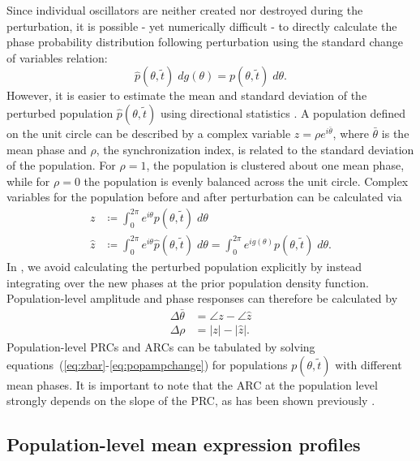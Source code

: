 Since individual oscillators are neither created nor destroyed during the perturbation, it is possible - yet numerically difficult - to directly calculate the phase probability distribution following perturbation using the standard change of variables relation:
\begin{equation}
  \hat{p}(\theta, \tilde{t})\; dg(\theta) = p(\theta, \tilde{t})\; d\theta.
  \label{eq:pdfinversion}
\end{equation}
However, it is easier to estimate the mean and standard deviation of the perturbed population $\hat{p}(\theta, \tilde{t})$ using directional statistics \cite{Mardia2009}.
A population defined on the unit circle can be described by a complex variable $z = \rho e^{i\bar{\theta}}$, where $\bar{\theta}$ is the mean phase and $\rho$, the synchronization index, is related to the standard deviation of the population.
For $\rho = 1$, the population is clustered about one mean phase, while for $\rho = 0$ the population is evenly balanced across the unit circle.
Complex variables for the population before and after perturbation can be calculated via
\begin{align}
  z &\coloneqq \int_0^{2\pi} e^{i\theta} p(\theta, \tilde{t}) \; d\theta \label{eq:zbar}\\
  \hat{z} &\coloneqq  \int_0^{2\pi} e^{i\theta} \hat{p}(\theta, \tilde{t}) \; d\theta = \int_0^{2\pi} e^{i g(\theta)} p(\theta, \tilde{t}) \; d\theta.
  \label{eq:zhat}
\end{align}
In , we avoid calculating the perturbed population explicitly by instead integrating over the new phases at the prior population density function.
Population-level amplitude and phase responses can therefore be calculated by
\begin{align}
  \Delta \bar{\theta} &= \angle z - \angle \hat{z} \label{eq:popphasechange}\\
  \Delta \rho &= |z| - |\hat{z}|. \label{eq:popampchange}
\end{align}
Population-level PRCs and ARCs can be tabulated by solving equations~(\ref{eq:zbar}-\ref{eq:popampchange}) for populations $p(\theta, \tilde{t})$ with different mean phases.
It is important to note that the ARC at the population level strongly depends on the slope of the PRC, as has been shown previously \cite{Ukai2007}.


\subsection{Population-level mean expression profiles}

